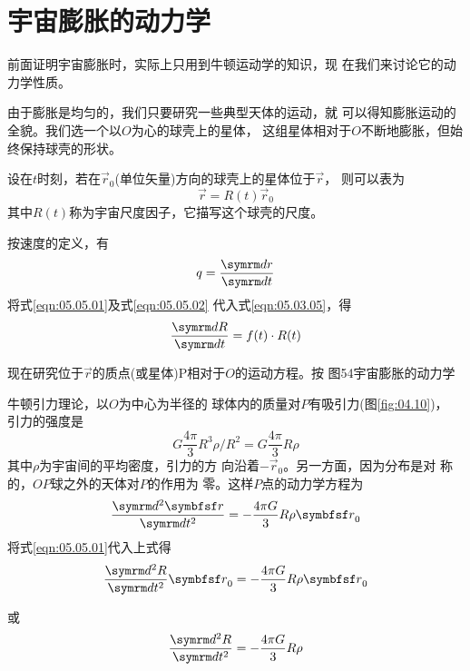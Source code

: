 \section{宇宙膨胀的动力学}\label{sec:05.05}

前面证明宇宙膨胀时，实际上只用到牛顿运动学的知识，现
在我们来讨论它的动力学性质。

由于膨胀是均匀的，我们只要研究一些典型天体的运动，就
可以得知膨胀运动的全貌。我们选一个以$ O $为心的球壳上的星体，
这组星体相对于$ O $不断地膨胀，但始终保持球壳的形状。

设在$ t $时刻，若在$ \vec{r}_0 $(单位矢量)方向的球壳上的星体位于$ \vec{r} $，
则可以表为
\begin{equation}\label{eqn:05.05.01}
 \vec{r} = R ( t ) \vec{r} _ { 0 }
\end{equation}
其中$ R(t) $称为宇宙尺度因子，它描写这个球壳的尺度。

按速度的定义，有
\begin{equation}\label{eqn:05.05.02}
 q = \frac { \dif r } { \dif t }
\end{equation}
将式\eqref{eqn:05.05.01}及式\eqref{eqn:05.05.02} 代入式\eqref{eqn:05.03.05}，得
\begin{equation}\label{eqn:05.05.03}
 \frac { \dif R } { \dif t } = f ( t ) \cdot R ( t )
\end{equation}

现在研究位于$\vec{r}$的质点(或星体)$ $P相对于$ O $的运动方程。按
图54宇宙膨胀的动力学

牛顿引力理论，以$ O $为中心为半径的
球体内的质量对$ P $有吸引力(图\ref{fig:04.10})，
引力的强度是
\begin{equation*}
 G \frac { 4 \pi } { 3 } R ^ { 3 } \rho / R ^ { 2 } = G \frac { 4 \pi } { 3 } R \rho
\end{equation*}
其中$ \rho $为宇宙间的平均密度，引力的方
向沿着$ - \vec{r} _ 0 $。另一方面，因为分布是对
称的，$ OP $球之外的天体对$ P $的作用为
零。这样$ P $点的动力学方程为
\begin{equation*}
 \frac { \dif ^ { 2 } \vec{r} } { \dif t ^ { 2 } } = - \frac { 4 \pi G } { 3 } R \rho \vec{ r } _ 0
\end{equation*}
将式\eqref{eqn:05.05.01}代入上式得
\begin{equation*}
 \frac { \dif ^ { 2 } R } { \dif t ^ { 2 } } \vec{r} _ { 0 } = - \frac { 4 \pi G } { 3 } R \rho \vec{r} _ 0
\end{equation*}

\clearpage
\noindent 或 \vspace{-0.6em}
\begin{equation}\label{eqn:05.05.04}
 \frac { \dif ^ { 2 } R } { \dif t ^ { 2 } } = - \frac { 4 \pi G } { 3 } R \rho
\end{equation}

